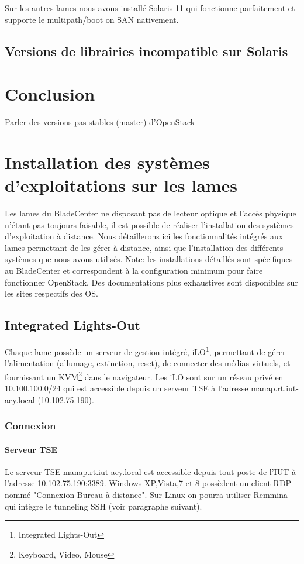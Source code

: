 \documentclass[a4paper,oneside]{report}
\begin{document}
Sur les autres lames nous avons installé Solaris 11 qui fonctionne parfaitement et supporte le multipath/boot on SAN nativement.

\section{Versions de librairies incompatible sur Solaris}
\label{sec:libsolaris}

\chapter{Conclusion}
Parler des versions pas stables (master) d'OpenStack

\appendix
\chapter{Installation des systèmes d'exploitations sur les lames}
Les lames du BladeCenter ne disposant pas de lecteur optique et l'accès physique n'étant pas toujours faisable, il est possible de réaliser l'installation des systèmes d'exploitation à distance.
Nous détaillerons ici les fonctionnalités intégrés aux lames permettant de les gérer à distance, ainsi que l'installation des différents systèmes que nous avons utilisés.\newline
Note: les installations détaillés sont spécifiques au BladeCenter et correspondent à la configuration minimum pour faire fonctionner OpenStack. Des documentations plus exhaustives sont disponibles sur les sites respectifs des OS.

\section{Integrated Lights-Out}
Chaque lame possède un serveur de gestion intégré, iLO\footnote{Integrated Lights-Out}, permettant de gérer l'alimentation (allumage, extinction, reset), de connecter des médias virtuels, et fournissant un KVM\footnote{Keyboard, Video, Mouse} dans le navigateur.
Les iLO sont sur un réseau privé en 10.100.100.0/24 qui est accessible depuis un serveur TSE à l'adresse manap.rt.iut-acy.local (10.102.75.190).

\subsection{Connexion}
\subsubsection{Serveur TSE}
Le serveur TSE manap.rt.iut-acy.local est accessible depuis tout poste de l'IUT à l'adresse 10.102.75.190:3389. Windows XP,Vista,7 et 8 possèdent un client RDP nommé "Connexion Bureau à distance". Sur Linux on pourra utiliser Remmina qui intègre le tunneling SSH (voir paragraphe suivant).
\end{document}
